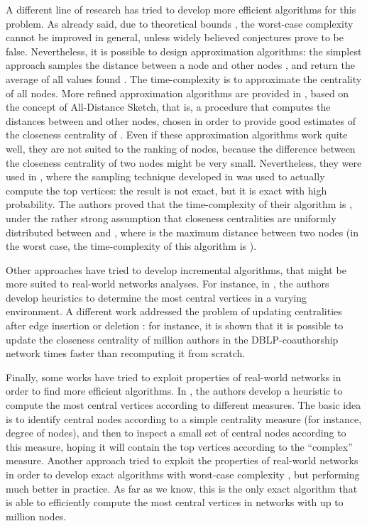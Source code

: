 \documentclass{acm_proc_article-sp}
\begin{document}
A different line of research has tried to develop more efficient algorithms for this problem. As already said, due to theoretical bounds \cite{Borassi2014b,Abboud2015}, the worst-case complexity cannot be improved in general, unless widely believed conjectures prove to be false. Nevertheless, it is possible to design approximation algorithms: the simplest approach samples the distance between a node  and  other nodes , and return the average of all values  found \cite{Eppstein2004}. The time-complexity is  to approximate the centrality of all nodes. More refined approximation algorithms are provided in \cite{Cohen2014c,Cohen2014d}, based on the concept of All-Distance Sketch, that is, a procedure that computes the distances between  and  other nodes, chosen in order to provide good estimates of the closeness centrality of . Even if these approximation algorithms work quite well, they are not suited to the ranking of nodes, because the difference between the closeness centrality of two nodes might be very small. Nevertheless, they were used in \cite{Okamoto2008}, where the sampling technique developed in \cite{Eppstein2004} was used to actually compute the top  vertices: the result is not exact, but it is exact with high probability. The authors proved that the time-complexity of their algorithm is , under the rather strong assumption that closeness centralities are uniformly distributed between  and , where  is the maximum distance between two nodes (in the worst case, the time-complexity of this algorithm is ).

Other approaches have tried to develop incremental algorithms, that might be more suited to real-world networks analyses. For instance, in \cite{Lim2011}, the authors develop heuristics to determine the  most central vertices in a varying environment. A different work addressed the problem of updating centralities after edge insertion or deletion \cite{Saryuce2013}: for instance, it is shown that it is possible to update the closeness centrality of  million authors in the DBLP-coauthorship network  times faster than recomputing it from scratch.

Finally, some works have tried to exploit properties of real-world networks in order to find more efficient algorithms. In \cite{LeMerrer2014}, the authors develop a heuristic to compute the  most central vertices according to different measures. The basic idea is to identify central nodes according to a simple centrality measure (for instance, degree of nodes), and then to inspect a small set of central nodes according to this measure, hoping it will contain the top  vertices according to the ``complex'' measure. Another approach \cite{Olsen2014} tried to exploit the properties of real-world networks in order to develop exact algorithms with worst-case complexity , but performing much better in practice. As far as we know, this is the only exact algorithm that is able to efficiently compute the  most central vertices in networks with up to  million nodes.
\end{document}
